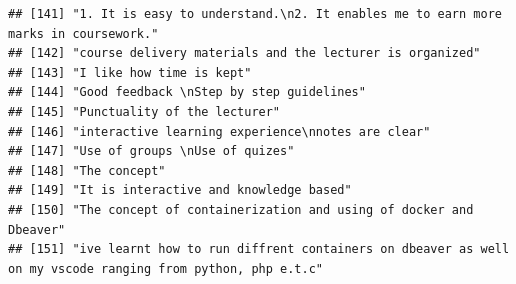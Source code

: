 \documentclass[
]{article}
\begin{document}
\begin{verbatim}
## [141] "1. It is easy to understand.\n2. It enables me to earn more marks in coursework."                                                                                                                                                                 
## [142] "course delivery materials and the lecturer is organized"                                                                                                                                                                                          
## [143] "I like how time is kept"                                                                                                                                                                                                                          
## [144] "Good feedback \nStep by step guidelines"                                                                                                                                                                                                          
## [145] "Punctuality of the lecturer"                                                                                                                                                                                                                      
## [146] "interactive learning experience\nnotes are clear"                                                                                                                                                                                                 
## [147] "Use of groups \nUse of quizes"                                                                                                                                                                                                                    
## [148] "The concept"                                                                                                                                                                                                                                      
## [149] "It is interactive and knowledge based"                                                                                                                                                                                                            
## [150] "The concept of containerization and using of docker and Dbeaver"                                                                                                                                                                                  
## [151] "ive learnt how to run diffrent containers on dbeaver as well on my vscode ranging from python, php e.t.c"                                                                                                                                         

\end{verbatim}
\end{document}
